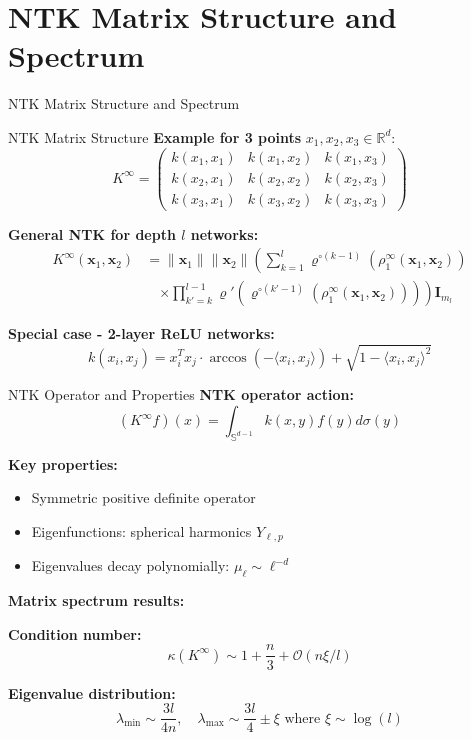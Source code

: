 \documentclass{beamer}
\begin{document}
\section{NTK Matrix Structure and Spectrum}

\begin{frame}
\begin{center}
\huge{NTK Matrix Structure and Spectrum}
\end{center}
\end{frame}

\begin{frame}{NTK Matrix Structure}
\textbf{Example for 3 points} $x_1, x_2, x_3 \in \mathbb{R}^d$:
\[
K^{\infty} = \begin{pmatrix} 
k(x_1,x_1) & k(x_1,x_2) & k(x_1,x_3) \\
k(x_2,x_1) & k(x_2,x_2) & k(x_2,x_3) \\
k(x_3,x_1) & k(x_3,x_2) & k(x_3,x_3)
\end{pmatrix}
\]

\textbf{General NTK for depth $l$ networks:}
\begin{align*}
K^{\infty}(\mathbf{x}_1, \mathbf{x}_2) &= \|\mathbf{x}_1\| \|\mathbf{x}_2\| \left( \sum_{k=1}^l \varrho^{\circ (k-1)}\left(\rho_1^{\infty}(\mathbf{x}_1, \mathbf{x}_2)\right) \right. \\
&\quad \left. \times \prod_{k'=k}^{l-1} \varrho'\left(\varrho^{\circ (k'-1)}\left(\rho_1^{\infty}(\mathbf{x}_1, \mathbf{x}_2)\right)\right) \right) \mathbf{I}_{m_l}
\end{align*}

\textbf{Special case - 2-layer ReLU networks:}
\[
k(x_i,x_j) = x_i^T x_j \cdot \arccos(-\langle x_i,x_j \rangle) + \sqrt{1-\langle x_i,x_j \rangle^2}
\]
\end{frame}

\begin{frame}{NTK Operator and Properties}
\textbf{NTK operator action:}
\[
(K^{\infty} f)(x) = \int_{\mathbb{S}^{d-1}} k(x,y)f(y)d\sigma(y)
\]

\textbf{Key properties:}
\begin{itemize}
\item Symmetric positive definite operator
\item Eigenfunctions: spherical harmonics $Y_{\ell,p}$
\item Eigenvalues decay polynomially: $\mu_\ell \sim \ell^{-d}$
\end{itemize}

\textbf{Matrix spectrum results:}

\textbf{Condition number:}
\[ \kappa(K^{\infty}) \sim 1 + \frac{n}{3} + \mathcal{O}(n \xi / l) \]

\textbf{Eigenvalue distribution:}
\[ \lambda_{\text{min}} \sim \frac{3l}{4n}, \quad \lambda_{\text{max}} \sim \frac{3l}{4} \pm \xi \text{ where } \xi \sim \log(l) \]
\end{frame}
\end{document}

